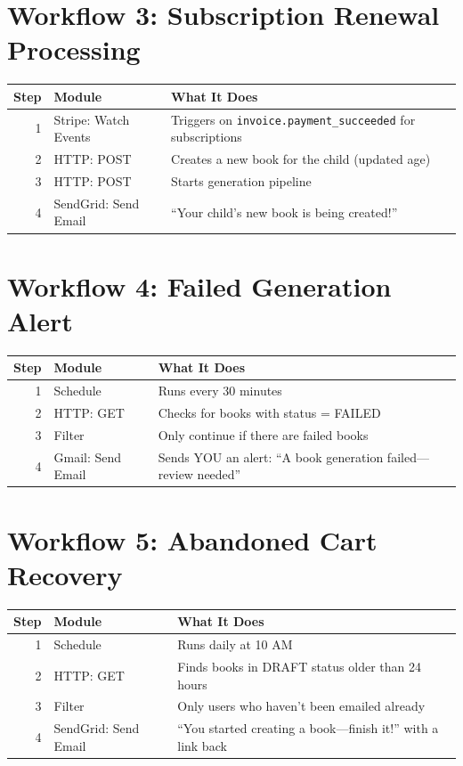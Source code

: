 \documentclass[12pt, letterpaper, oneside]{book}
\begin{document}
\section{Workflow 3: Subscription Renewal Processing}

\begin{table}[H]
\centering
\small
\begin{tabularx}{\textwidth}{rlX}
\toprule
\textbf{Step} & \textbf{Module} & \textbf{What It Does} \\
\midrule
1 & Stripe: Watch Events & Triggers on \texttt{invoice.payment\_succeeded} for subscriptions \\
2 & HTTP: POST & Creates a new book for the child (updated age) \\
3 & HTTP: POST & Starts generation pipeline \\
4 & SendGrid: Send Email & ``Your child's new book is being created!'' \\
\bottomrule
\end{tabularx}
\end{table}

\section{Workflow 4: Failed Generation Alert}

\begin{table}[H]
\centering
\small
\begin{tabularx}{\textwidth}{rlX}
\toprule
\textbf{Step} & \textbf{Module} & \textbf{What It Does} \\
\midrule
1 & Schedule & Runs every 30 minutes \\
2 & HTTP: GET & Checks for books with status = FAILED \\
3 & Filter & Only continue if there are failed books \\
4 & Gmail: Send Email & Sends YOU an alert: ``A book generation failed---review needed'' \\
\bottomrule
\end{tabularx}
\end{table}

\section{Workflow 5: Abandoned Cart Recovery}

\begin{table}[H]
\centering
\small
\begin{tabularx}{\textwidth}{rlX}
\toprule
\textbf{Step} & \textbf{Module} & \textbf{What It Does} \\
\midrule
1 & Schedule & Runs daily at 10 AM \\
2 & HTTP: GET & Finds books in DRAFT status older than 24 hours \\
3 & Filter & Only users who haven't been emailed already \\
4 & SendGrid: Send Email & ``You started creating a book---finish it!'' with a link back \\
\bottomrule
\end{tabularx}
\end{table}
\end{document}
